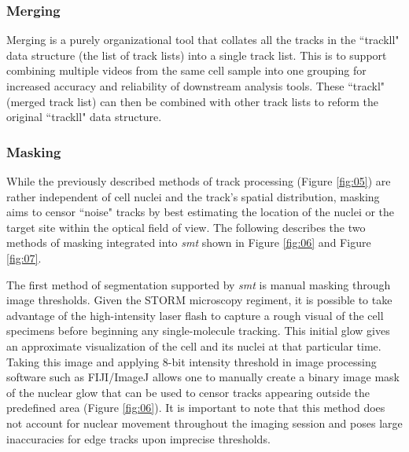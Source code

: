 \documentclass{bioinfo}
\begin{document}
\subsubsection{Merging}

Merging is a purely organizational tool that collates all the tracks in the ``trackll" data structure (the list of track lists) into a single track list. This is to support combining multiple videos from the same cell sample into one grouping for increased accuracy and reliability of downstream analysis tools. These ``trackl" (merged track list) can then be combined with other track lists to reform the original ``trackll" data structure.

\subsubsection{Masking}

While the previously described methods of track processing (Figure \ref{fig:05}) are rather independent of cell nuclei and the track's spatial distribution, masking aims to censor ``noise" tracks by best estimating the location of the nuclei or the target site within the optical field of view. The following describes the two methods of masking integrated into \textit{smt} shown in Figure \ref{fig:06} and Figure \ref{fig:07}.

The first method of segmentation supported by \textit{smt} is manual masking through image thresholds. Given the STORM microscopy regiment, it is possible to take advantage of the high-intensity laser flash to capture a rough visual of the cell specimens before beginning any single-molecule tracking. This initial glow gives an approximate visualization of the cell and its nuclei at that particular time. Taking this image and applying 8-bit intensity threshold in image processing software such as FIJI/ImageJ allows one to manually create a binary image mask of the nuclear glow that can be used to censor tracks appearing outside the predefined area (Figure \ref{fig:06}). It is important to note that this method does not account for nuclear movement throughout the imaging session and poses large inaccuracies for edge tracks upon imprecise thresholds.
\end{document}
